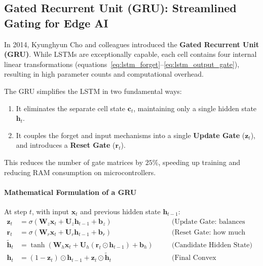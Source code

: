 \subsection{Gated Recurrent Unit (GRU): Streamlined Gating for Edge AI}\label{subsec:gru}

In 2014, Kyunghyun Cho and colleagues introduced the \textbf{Gated Recurrent Unit (GRU)}. While LSTMs are exceptionally capable, each cell contains four internal linear transformations (equations~\eqref{eq:lstm_forget}--\eqref{eq:lstm_output_gate}), resulting in high parameter counts and computational overhead.

\begin{keyidea}
The GRU simplifies the LSTM in two fundamental ways:
\begin{enumerate}
    \item It eliminates the separate cell state $\mathbf{c}_t$, maintaining only a single hidden state $\mathbf{h}_t$.
    \item It couples the forget and input mechanisms into a single \textbf{Update Gate} ($\mathbf{z}_t$), and introduces a \textbf{Reset Gate} ($\mathbf{r}_t$).
\end{enumerate}
This reduces the number of gate matrices by $25\%$, speeding up training and reducing RAM consumption on microcontrollers.
\end{keyidea}

\paragraph{Mathematical Formulation of a GRU}
At step $t$, with input $\mathbf{x}_t$ and previous hidden state $\mathbf{h}_{t-1}$:
\begin{align}
\mathbf{z}_t &= \sigma(\mathbf{W}_z \mathbf{x}_t + \mathbf{U}_z \mathbf{h}_{t-1} + \mathbf{b}_z) \quad &&\text{(Update Gate: balances past vs new)}\label{eq:gru_update} \\
\mathbf{r}_t &= \sigma(\mathbf{W}_r \mathbf{x}_t + \mathbf{U}_r \mathbf{h}_{t-1} + \mathbf{b}_r) \quad &&\text{(Reset Gate: how much past to drop)}\label{eq:gru_reset} \\
\tilde{\mathbf{h}}_t &= \tanh(\mathbf{W}_h \mathbf{x}_t + \mathbf{U}_h (\mathbf{r}_t \odot \mathbf{h}_{t-1}) + \mathbf{b}_h) \quad &&\text{(Candidate Hidden State)}\label{eq:gru_cand} \\
\mathbf{h}_t &= (1 - \mathbf{z}_t) \odot \mathbf{h}_{t-1} + \mathbf{z}_t \odot \tilde{\mathbf{h}}_t \quad &&\text{(Final Convex Interpolation)}\label{eq:gru_final}
\end{align}

